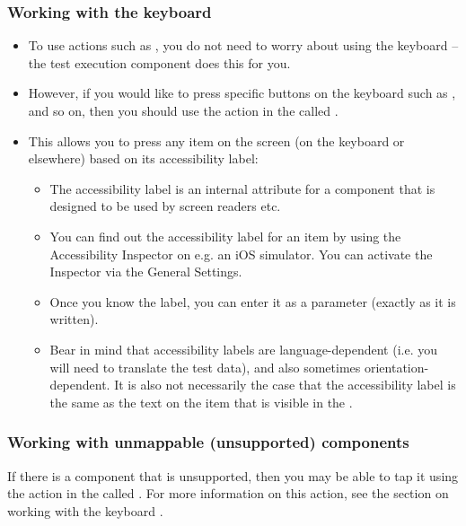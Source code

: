 \subsubsection{Working with the keyboard}
\label{ToolkitiOSKeyboard}
\begin{itemize}
\item To use actions such as , you do not need to worry about using the keyboard -- the test execution component does this for you.
\item However, if you would like to press specific buttons on the keyboard such as ,  and so on, then you should use the action in the  called .
\item This allows you to press any item on the screen (on the keyboard or elsewhere) based on its accessibility label:
\begin{itemize}
\item The accessibility label is an internal attribute for a component that is designed to be used by screen readers etc.
\item You can find out the accessibility label for an item by using the Accessibility Inspector on e.g. an iOS simulator. You can activate the Inspector via the General Settings. 
\item Once you know the label, you can enter it as a parameter (exactly as it is written).
\item Bear in mind that accessibility labels are language-dependent (i.e. you will need to translate the test data), and also sometimes orientation-dependent. It is also not necessarily the case that the accessibility label is the same as the text on the item that is visible in the \gdaut{}.  
\end{itemize}
\end{itemize}

\subsubsection{Working with unmappable (unsupported) components}
If there is a component that is unsupported, then you may be able to tap it using the action in the  called . For more information on this action, see the section on working with the keyboard .

